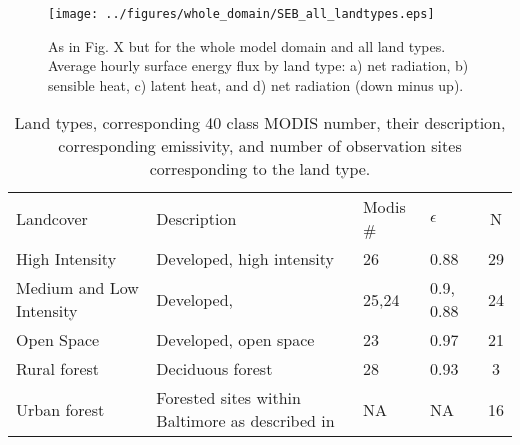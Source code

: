 \documentclass[draft,linenumbers]{agujournal}
\begin{document}
\begin{figure}[h]
\centering
\texttt{[image: ../figures/whole\_domain/SEB\_all\_landtypes.eps]}
\caption{As in Fig. X but for the whole model domain and all land types. Average hourly surface energy flux by land type: a) net radiation, b) sensible heat, c) latent heat, and d) net radiation (down minus up).}
\label{fig:seb_wd}
\end{figure}

%
\begin{table}
\centering
\begin{tabular}{l l l l c}
Landcover & Description &  Modis \# & $\epsilon$ & N  \\
High Intensity & Developed, high intensity & 26& 0.88 & 29 \\
Medium and Low Intensity & Developed, & 25,24& 0.9, 0.88 & 24\\
Open Space& Developed, open space &23 & 0.97 &  21\\
Rural forest&Deciduous forest & 28& 0.93& 3\\
Urban forest& Forested sites within Baltimore as described in \cite{} &NA & NA & 16\\
\end{tabular}
\caption{Land types, corresponding 40 class MODIS number, their description, corresponding emissivity, and number of observation sites corresponding to the land type.}
\label{tab:lcc}
\end{table}
\end{document}
